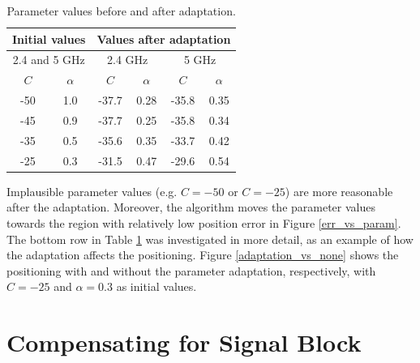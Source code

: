 \documentclass{LTHthesis}
\begin{document}
\begin{table}[!hbt]
\begin{center}
\begin{tabular}{|c|c|c|c|c|c|}
\hline
\multicolumn{2}{|c|}{Initial values}
&\multicolumn{4}{|c|}{Values after adaptation} \\
\hline
\hline
\multicolumn{2}{|c|}{2.4 and 5 GHz}
&\multicolumn{2}{|c|}{2.4 GHz}
&\multicolumn{2}{|c|}{5 GHz} \\

\hline
$C$ & $\alpha$ & $C$ & $\alpha$& $C$& $\alpha$\\
\hline
-50 & 1.0 & -37.7 & 0.28 & -35.8 & 0.35\\
\hline
-45 & 0.9 & -37.7 & 0.25 & -35.8 & 0.34\\
\hline
-35 & 0.5 & -35.6 & 0.35 & -33.7 & 0.42\\
\hline
-25 & 0.3 & -31.5 & 0.47 & -29.6 & 0.54\\
\hline
\end{tabular}
\end{center}
\caption{Parameter values before and after adaptation.}\label{table:parameter_adaptation}
\end{table}

Implausible parameter values (e.g. $C = -50$ or $C = -25$) are more reasonable after the adaptation. Moreover, the algorithm moves the parameter values towards the region with relatively low position error in Figure \ref{err_vs_param}. The bottom row in Table \ref{table:parameter_adaptation} was investigated in more detail, as an example of how the adaptation affects the positioning. Figure \ref{adaptation_vs_none} shows the positioning with and without the parameter adaptation, respectively, with $C = -25$ and $\alpha = 0.3$ as initial values.

\section{Compensating for Signal Block} %
%
\end{document}
